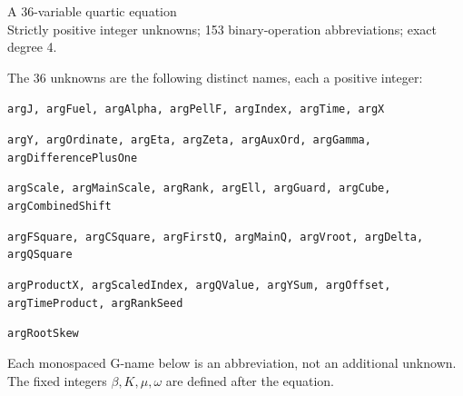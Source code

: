 \documentclass[10pt]{article}
\begin{document}
\begin{center}{\Large A 36-variable quartic equation}\\
Strictly positive integer unknowns; 153 binary-operation abbreviations; exact degree 4.
\end{center}
The 36 unknowns are the following distinct names, each a positive integer:
\par\small
\noindent\texttt{argJ, argFuel, argAlpha, argPellF, argIndex, argTime, argX}\par
\noindent\texttt{argY, argOrdinate, argEta, argZeta, argAuxOrd, argGamma, argDifferencePlusOne}\par
\noindent\texttt{argScale, argMainScale, argRank, argEll, argGuard, argCube, argCombinedShift}\par
\noindent\texttt{argFSquare, argCSquare, argFirstQ, argMainQ, argVroot, argDelta, argQSquare}\par
\noindent\texttt{argProductX, argScaledIndex, argQValue, argYSum, argOffset, argTimeProduct, argRankSeed}\par
\noindent\texttt{argRootSkew}\par
\normalsize
Each monospaced G-name below is an abbreviation, not an additional unknown.
The fixed integers $\beta,K,\mu,\omega$ are defined after the equation.
\end{document}
